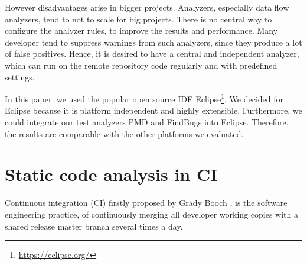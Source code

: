 \documentclass[conference]{IEEEtran}
\begin{document}
However disadvantages arise in bigger projects. Analyzers, especially data flow analyzers, tend to not to scale for big projects. 
There is no central way to configure the analyzer rules, to improve the results and performance.
Many developer tend to suppress warnings from such analyzers, since they produce a lot of false positives.
Hence, it is desired to have a central and independent analyzer, which can run on the remote repository code regularly and with predefined settings.

In this paper. we used the popular open source IDE Eclipse\footnote{\href{https://eclipse.org/}{https://eclipse.org/}}.
We decided for Eclipse because it is platform independent and highly extensible. Furthermore, we could integrate our test analyzers PMD and FindBugs into Eclipse. Therefore, the results are comparable with the other platforms we evaluated.


\section{Static code analysis in CI}
\label{sec:static_code_analysis_ci}
Continuous integration (CI) firstly proposed by Grady Booch \cite{CI-Definition:Booch:1993}, is the software engineering practice, of continuously merging all developer working copies with a shared release master branch several times a day.
\end{document}
